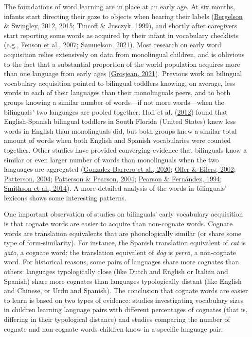 \documentclass[
]{article}
\begin{document}
The foundations of word learning are in place at an early age. At six
months, infants start directing their gaze to objects when hearing their
labels (\protect\hyperlink{ref-bergelson2012months}{Bergelson \&
Swingley, 2012}, \protect\hyperlink{ref-bergelson2015early}{2015};
\protect\hyperlink{ref-tincoff1999beginnings}{Tincoff \& Jusczyk,
1999}), and shortly after caregivers start reporting some words as
acquired by their infant in vocabulary checklists (e.g.,
\protect\hyperlink{ref-fenson2007macarthurbates}{Fenson et al., 2007};
\protect\hyperlink{ref-samuelson2021precision}{Samuelson, 2021}). Most
research on early word acquisition relies extensively on data from
monolingual children, and is oblivious to the fact that a substantial
proportion of the world population acquires more than one language from
early ages (\protect\hyperlink{ref-grosjean2021extent}{Grosjean, 2021}).
Previous work on bilingual vocabulary acquisition pointed to bilingual
toddlers knowing, on average, less words in each of their languages than
their monolinguals peers, and to both groups knowing a similar number of
words---if not more words---when the bilinguals' two languages are
pooled together. Hoff et al.
(\protect\hyperlink{ref-hoff2012dual}{2012}) found that English-Spanish
bilingual toddlers in South Florida (United States) knew less words in
English than monolinguals did, but both groups knew a similar total
amount of words when both English and Spanish vocabularies were counted
together. Other studies have provided converging evidence that
bilinguals know a similar or even larger number of words than
monolinguals when the two languages are aggregated
(\protect\hyperlink{ref-gonzalez-barrero2020bilingual}{Gonzalez-Barrero
et al., 2020}; \protect\hyperlink{ref-oller2002language}{Oller \&
Eilers, 2002}; \protect\hyperlink{ref-patterson2004comparing}{Patterson,
2004}; \protect\hyperlink{ref-patterson2004bilingual}{Patterson \&
Pearson, 2004}; \protect\hyperlink{ref-pearson1994patterns}{Pearson \&
Fernández, 1994};
\protect\hyperlink{ref-smithson2014bilingualism}{Smithson et al.,
2014}). A more detailed analysis of the words in bilinguals' lexicons
shows some interesting patterns.

One important observation of studies on bilinguals' early vocabulary
acquisition is that cognate words are easier to acquire than non-cognate
words. Cognate words are translation equivalents that are phonologically
similar (or share some type of form-similarity). For instance, the
Spanish translation equivalent of \emph{cat} is \emph{gato}, a cognate
word; the translation equivalent of \emph{dog} is \emph{perro}, a
non-cognate word. For historical reasons, some pairs of languages share
more cognates than others: languages typologically close (like Dutch and
English or Italian and Spanish) share more cognates than languages
typologically distant (like English and Chinese, or Urdu and Spanish).
The conclusion that cognate words are easier to learn is based on two
types of evidence: studies investigating vocabulary sizes in children
learning language pairs with different percentages of cognates (that is,
differing in their typological distance) and studies comparing the
number of cognate and non-cognate words children know in a specific
language pair.
\end{document}
